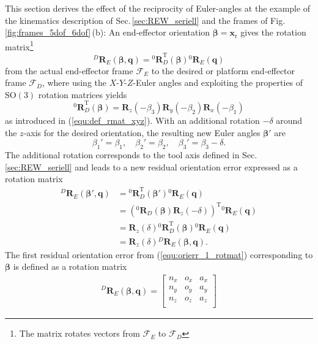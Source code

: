 \documentclass[robotics,article,submit,moreauthors,pdftex]{Definitions/mdpi}
\newcommand{\bm}[1]{\boldsymbol{#1}}
\newcommand{\rotmat}[2]{{{ }^{#1}\boldsymbol{R}}_{#2}}
\newcommand{\transp}[0]{{\mathrm{T}}}
\newcommand{\ks}[1]{{\mathcal{F}}_{#1}}
\begin{document}
This section derives the effect of the reciprocity of Euler-angles at the example of the kinematics description of Sec.\,\ref{sec:REW_seriell} and the frames of Fig.\,\ref{fig:frames_5dof_6dof}\,(b):
%
An end-effector orientation $\bm{\beta}=\bm{x}_{\mathrm{r}}$ gives the rotation matrix\footnote{The matrix rotates vectors from $\ks{E}$ to $\ks{D}$}
%
\begin{equation}
\rotmat{D}{E}(\bm{\beta},\bm{q})
= 
\rotmat{0}{D}^\transp (\bm{\beta})\rotmat{0}{E}(\bm{q})
\label{equ:orierr_1_rotmat}
\end{equation}
%
from the actual end-effector frame $\ks{E}$ to the desired or platform end-effector frame $\ks{D}$,
where using the $X$-$Y$-$Z$-Euler angles and exploiting the properties of $\mathrm{SO(3)}$ rotation matrices yields
%
\begin{equation}
\rotmat{0}{D}^\transp(\bm{\beta})
=
\bm{R}_z(-\beta_3) \bm{R}_y(-\beta_2) \bm{R}_x(-\beta_1)
\end{equation}
%
as introduced in (\ref{equ:def_rmat_xyz}).
With an additional rotation $-\delta$ around the $z$-axis for the desired orientation, the resulting new Euler angles $\bm{\beta}'$ are
%
\begin{equation}
\beta_1'=\beta_1,  \quad \beta_2'=\beta_2,  \quad \beta_3'=\beta_3-\delta.
\end{equation}
%
The additional rotation corresponds to the tool axis defined in Sec.\,\ref{sec:REW_seriell} %
and leads to a new residual orientation error expressed as a rotation matrix
%
\begin{align}
    \rotmat{D}{E}(\bm{\beta}',\bm{q})
    &=
    \rotmat{0}{D}^\transp (\bm{\beta}') \rotmat{0}{E}(\bm{q}) \nonumber\\
    &=
    \left(\rotmat{0}{D}(\bm{\beta})\bm{R}_z(-\delta)\right)^\transp \rotmat{0}{E}(\bm{q}) \nonumber \\
    &=
    \bm{R}_z(\delta) \rotmat{0}{D}^\transp (\bm{\beta}) \rotmat{0}{E}(\bm{q}) \nonumber \\
    &=
    \bm{R}_z(\delta) \rotmat{D}{E}(\bm{\beta},\bm{q}).
    \label{equ:orierr_2_rotmat}
\end{align}
%
The first residual orientation error from (\ref{equ:orierr_1_rotmat}) corresponding to $\bm{\beta}$ is defined as a rotation matrix
%
\begin{align}
    \rotmat{D}{E}(\bm{\beta},\bm{q})
    =
    \begin{bmatrix}
        {n_x}&{o_x}&{a_x} \\
        {n_y}&{o_y}&{a_y} \\ 
        {n_z}&{o_z}&{a_z} \\ 
    \end{bmatrix}
    \label{equ:orierr_1_rotmat_def}
\end{align}
\end{document}
